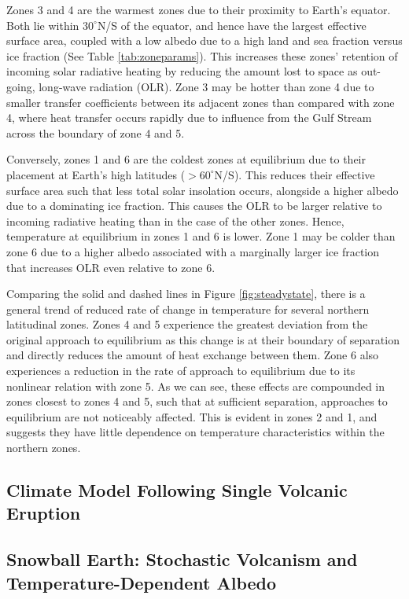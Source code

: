 \documentclass{article}
\begin{document}
Zones 3 and 4 are the warmest zones due to their proximity to Earth's equator. Both lie within $30^{\circ}$N/S of the equator, and hence have the largest effective surface area, coupled with a low albedo due to a high land and sea fraction versus ice fraction (See Table \ref{tab:zoneparams}). This increases these zones' retention of incoming solar radiative heating by reducing the amount lost to space as out-going, long-wave radiation (OLR). Zone 3 may be hotter than zone 4 due to smaller transfer coefficients between its adjacent zones than compared with zone 4, where heat transfer occurs rapidly due to influence from the Gulf Stream across the boundary of zone 4 and 5. 

Conversely, zones 1 and 6 are the coldest zones at equilibrium due to their placement at Earth's high latitudes ($>60^{\circ}$N/S). This reduces their effective surface area such that less total solar insolation occurs, alongside a higher albedo due to a dominating ice fraction. This causes the OLR to be larger relative to incoming radiative heating than in the case of the other zones. Hence, temperature at equilibrium in zones 1 and 6 is lower. Zone 1 may be colder than zone 6 due to a higher albedo associated with a marginally larger ice fraction that increases OLR even relative to zone 6.

Comparing the solid and dashed lines in Figure \ref{fig:steadystate}, there is a general trend of reduced rate of change in temperature for several northern latitudinal zones. Zones 4 and 5 experience the greatest deviation from the original approach to equilibrium as this change is at their boundary of separation and directly reduces the amount of heat exchange between them. Zone 6 also experiences a reduction in the rate of approach to equilibrium due to its nonlinear relation with zone 5. As we can see, these effects are compounded in zones closest to zones 4 and 5, such that at sufficient separation, approaches to equilibrium are not noticeably affected. This is evident in zones 2 and 1, and suggests they have little dependence on temperature characteristics within the northern zones. 

\subsection{Climate Model Following Single Volcanic Eruption}
\subsection{Snowball Earth: Stochastic Volcanism and Temperature-Dependent Albedo}
\label{sec:snowballearth}
\end{document}
